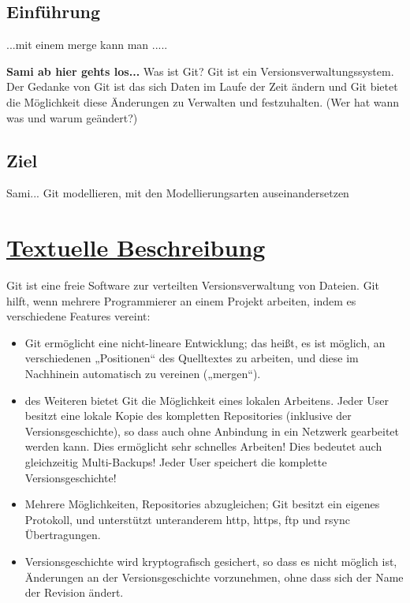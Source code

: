 \documentclass[a4paper]{article}
\begin{document}
\subsection{Einführung} %

...mit einem \gls{merge} kann man .....    %

	\textbf{Sami ab hier gehts los...} %
Was ist Git? Git ist ein Versionsverwaltungssystem. 	
Der Gedanke von Git ist das sich Daten im Laufe der Zeit ändern und Git bietet die Möglichkeit
diese Änderungen zu Verwalten und festzuhalten. (Wer hat wann was und warum geändert?)

\subsection{Ziel}
	Sami...
	Git modellieren, mit den Modellierungsarten auseinandersetzen	
\newpage	%
\section{\underline{Textuelle Beschreibung}}

Git ist eine freie Software zur verteilten Versionsverwaltung von Dateien. Git hilft, wenn mehrere Programmierer an einem Projekt arbeiten, indem es verschiedene Features vereint:

  \begin{itemize} %
     
\item Git ermöglicht eine nicht-lineare Entwicklung; das heißt, es ist möglich, an verschiedenen „Positionen“ des Quelltextes zu arbeiten, und diese im Nachhinein automatisch zu vereinen („mergen“). %
\item des Weiteren bietet Git die Möglichkeit eines lokalen Arbeitens. Jeder User besitzt eine lokale Kopie des kompletten Repositories (inklusive der Versionsgeschichte), so dass auch ohne Anbindung in ein Netzwerk gearbeitet werden kann. Dies ermöglicht sehr schnelles Arbeiten!
Dies bedeutet auch gleichzeitig Multi-Backups! Jeder User speichert die komplette Versionsgeschichte!
\item Mehrere Möglichkeiten, Repositories abzugleichen; Git besitzt ein eigenes Protokoll, und unterstützt unteranderem http, https, ftp und rsync Übertragungen.
\item Versionsgeschichte wird kryptografisch gesichert, so dass es nicht möglich ist, Änderungen an der Versionsgeschichte vorzunehmen, ohne dass sich der Name der Revision ändert.

    \end{itemize} %
\end{document}
